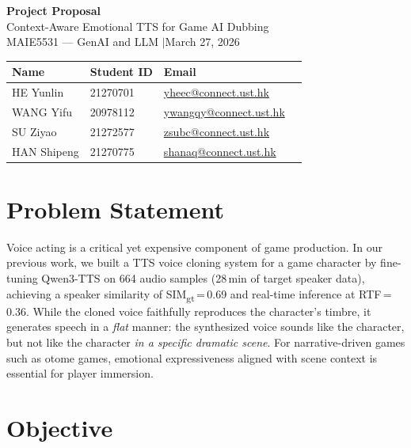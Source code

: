 \documentclass[11pt,a4paper]{article}
\begin{document}
\begin{center}
    {\LARGE\bfseries\color{accent} Project Proposal}\\[0.4em]
    {\large Context-Aware Emotional TTS for Game AI Dubbing}\\[0.8em]
    {\small MAIE5531 --- GenAI and LLM \quad$\vert$\quad March 27, 2026}
\end{center}

\vspace{0.3em}

\begin{center}
\begin{tabular}{@{}llll@{}}
\toprule
\textbf{Name} & \textbf{Student ID} & \textbf{Email} \\
\midrule
HE Yunlin   & 21270701 & \href{mailto:yheec@connect.ust.hk}{yheec@connect.ust.hk} \\
WANG Yifu   & 20978112 & \href{mailto:ywangqy@connect.ust.hk}{ywangqy@connect.ust.hk} \\
SU Ziyao    & 21272577 & \href{mailto:zsubc@connect.ust.hk}{zsubc@connect.ust.hk} \\
HAN Shipeng & 21270775 & \href{mailto:shanaq@connect.ust.hk}{shanaq@connect.ust.hk} \\
\bottomrule
\end{tabular}
\end{center}

\vspace{0.6em}

\section{Problem Statement}

Voice acting is a critical yet expensive component of game production. In our previous work, we built a TTS voice cloning system for a game character by fine-tuning Qwen3-TTS on 664 audio samples (28\,min of target speaker data), achieving a speaker similarity of SIM\textsubscript{gt}\,=\,0.69 and real-time inference at RTF\,=\,0.36. While the cloned voice faithfully reproduces the character's timbre, it generates speech in a \emph{flat} manner: the synthesized voice sounds like the character, but not like the character \emph{in a specific dramatic scene}. For narrative-driven games such as otome games, emotional expressiveness aligned with scene context is essential for player immersion.

\section{Objective}
\end{document}
